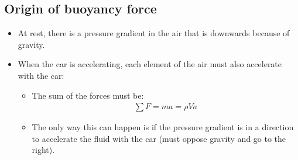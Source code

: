 \documentclass[aspectratio=169,
hyperref={colorlinks,urlcolor=blue}
]{beamer}
\begin{document}





\subsection{Origin of buoyancy force}
\label{subsec:originofbuoyancyforce}
{
\begin{itemize}
\item At rest, there is a pressure gradient in the air that is downwards because of gravity.
\item When the car is accelerating, each element of the air must also accelerate with the car:
\begin{itemize}
\item The sum of the forces must be:
\begin{align*}
\sum F = ma =\rho V a
\end{align*}
\item The only way this can happen is if the pressure gradient is in a direction to accelerate the fluid with the car (must oppose gravity and go to the right).
\end{itemize}

\end{itemize}
}
\end{document}
